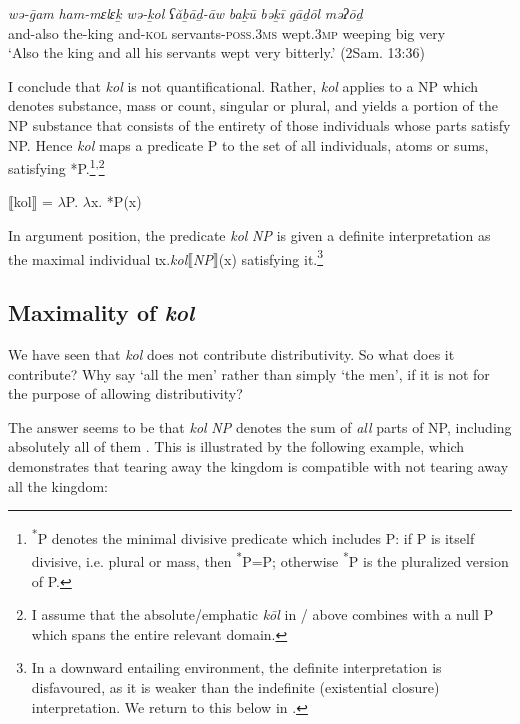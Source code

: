 \documentclass[output=paper]{langsci/langscibook}
\begin{document}
\ea%
    \label{ex:doron:21}
    \gll \textit{wə-ḡam}   \textit{ham-mɛlɛḵ}  \textit{wə-ḵol}     \textit{ʕăḇāḏ-āw}                  \textit{baḵū}          \textit{bəḵī}         \textit{gāḏōl} \textit{məʔōḏ}\\
         and-also  the-king      and-\textsc{kol} servants-\textsc{poss.3ms}  wept.\textsc{3mp}   weeping  big      very\\
    \glt `Also the king and all his servants wept very bitterly.' (2Sam. 13:36)
\z



I conclude that \textit{kol} is not quantificational. Rather, \textit{kol} applies to a NP which denotes substance, mass or count, singular or plural, and yields a portion of the NP substance that consists of the entirety of those individuals whose parts satisfy NP. Hence \textit{kol} maps a predicate P to the set of all individuals, atoms or sums, satisfying *P.\footnote{\textrm{\textsuperscript{*}}\textrm{P denotes the minimal divisive predicate \citep{Krifka1989} which includes P: if P is itself divisive, i.e. plural or mass, then} \textrm{\textsuperscript{*}}\textrm{P=P; otherwise} \textrm{\textsuperscript{*}}\textrm{P is the pluralized version of P.}}\textsuperscript{,}\footnote{\textrm{I assume that the absolute/emphatic} \textrm{\textit{kōl} }\textrm{in / above combines with a null P which spans the entire relevant domain.}}

\ea%
    \label{ex:doron:22}\relax
    $⟦$kol$⟧$ =  ${\lambda}$P. ${\lambda}$x. *P(x)
    \z

In argument position, the predicate \textit{kol} \textit{NP} is given a definite interpretation as the maximal individual ιx.\textit{kol}$⟦$\textit{NP}$⟧$(x) satisfying it.\footnote{\textrm{In a downward entailing environment, the definite interpretation is disfavoured, as it is weaker than the indefinite (existential closure) interpretation. We return to this below in .}}

\subsection{Maximality of \textit{kol}}\label{sec:doron:3.2}%

We have seen that \textit{kol} does not contribute distributivity. So what does it contribute? Why say ‘all the men’ rather than simply ‘the men’, if it is not for the purpose of allowing distributivity?

The answer seems to be that \textit{kol} \textit{NP} denotes the sum of \textit{all} parts of NP, including absolutely all of them \citet{Brisson1997,Brisson2003}. This is illustrated by the following example, which demonstrates that tearing away the kingdom is compatible with not tearing away all the kingdom:
\end{document}
